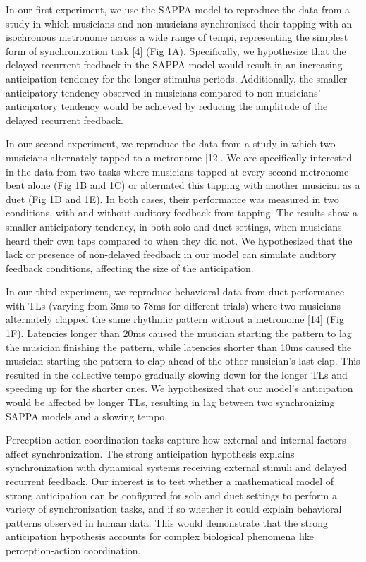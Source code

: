 \documentclass{report}
\begin{document}
In our first experiment, we use the SAPPA model to reproduce the data from a study in which musicians and non-musicians synchronized their tapping with an isochronous metronome across a wide range of tempi, representing the simplest form of synchronization task [4] (Fig 1A). Specifically, we hypothesize that the delayed recurrent feedback in the SAPPA model would result in an increasing anticipation tendency for the longer stimulus periods. Additionally, the smaller anticipatory tendency observed in musicians compared to non-musicians’ anticipatory tendency would be achieved by reducing the amplitude of the delayed recurrent feedback.

In our second experiment, we reproduce the data from a study in which two musicians alternately tapped to a metronome [12]. We are specifically interested in the data from two tasks where musicians tapped at every second metronome beat alone (Fig 1B and 1C) or alternated this tapping with another musician as a duet (Fig 1D and 1E). In both cases, their performance was measured in two conditions, with and without auditory feedback from tapping. The results show a smaller anticipatory tendency, in both solo and duet settings, when musicians heard their own taps compared to when they did not. We hypothesized that the lack or presence of non-delayed feedback in our model can simulate auditory feedback conditions, affecting the size of the anticipation.

In our third experiment, we reproduce behavioral data from duet performance with TLs (varying from 3ms to 78ms for different trials) where two musicians alternately clapped the same rhythmic pattern without a metronome [14] (Fig 1F). Latencies longer than 20ms caused the musician starting the pattern to lag the musician finishing the pattern, while latencies shorter than 10ms caused the musician starting the pattern to clap ahead of the other musician’s last clap. This resulted in the collective tempo gradually slowing down for the longer TLs and speeding up for the shorter ones. We hypothesized that our model’s anticipation would be affected by longer TLs, resulting in lag between two synchronizing SAPPA models and a slowing tempo.

Perception-action coordination tasks capture how external and internal factors affect synchronization. The strong anticipation hypothesis explains synchronization with dynamical systems receiving external stimuli and delayed recurrent feedback. Our interest is to test whether a mathematical model of strong anticipation can be configured for solo and duet settings to perform a variety of synchronization tasks, and if so whether it could explain behavioral patterns observed in human data. This would demonstrate that the strong anticipation hypothesis accounts for complex biological phenomena like perception-action coordination.
\end{document}
